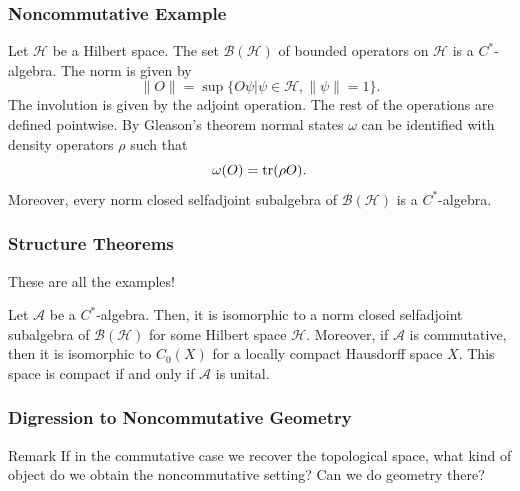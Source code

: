 \documentclass{beamer}
\begin{document}
\begin{frame}

	\frametitle{Noncommutative Example}
	
	\begin{Example}
		Let $\mathcal{H}$ be a Hilbert space. The set $\mathcal{B}(\mathcal{H})$ of bounded operators on $\mathcal{H}$ is a $C^*$-algebra. The norm is given by
		\begin{equation}
			\|O\|=\sup\{O\psi|\psi\in\mathcal{H},\|\psi\|=1\}.
		\end{equation}
The involution is given by the adjoint operation. The rest of the operations are defined pointwise. By Gleason's theorem normal states $\omega$ can be identified with density operators $\rho$ such that 
		\begin{equation}
			\omega(O)=\tr(\rho O).
		\end{equation}
Moreover, every norm closed selfadjoint subalgebra of $\mathcal{B}(\mathcal{H})$ is a $C^*$-algebra.
	\end{Example}

\end{frame}

\begin{frame}

	\frametitle{Structure Theorems}
	
	{\huge These are all the examples!}
	
	\begin{theorem}
		Let $\mathcal{A}$ be a $C^*$-algebra. Then, it is isomorphic to a norm closed selfadjoint subalgebra of $\mathcal{B}(\mathcal{H})$ for some Hilbert space $\mathcal{H}$. Moreover, if $\mathcal{A}$ is commutative, then it is isomorphic to $C_0(X)$ for a locally compact Hausdorff space $X$. This space is compact if and only if $\mathcal{A}$ is unital\cite{Bratteli1987}.
	\end{theorem}

\end{frame}

\begin{frame}

	\frametitle{Digression to Noncommutative Geometry}
	
	\begin{alertblock}{Remark}
		If in the commutative case we recover the topological space, what kind of object do we obtain the noncommutative setting? Can we do geometry there?
	\end{alertblock}

\end{frame}
\end{document}
